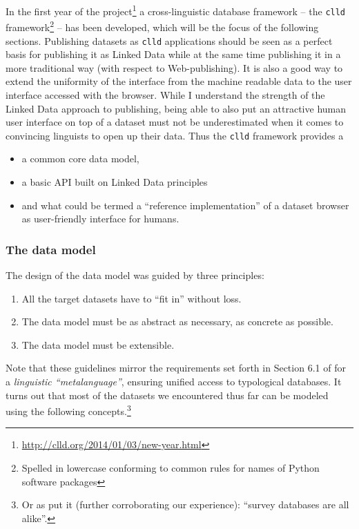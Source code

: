 \documentclass[a4paper,10pt]{article}
\begin{document}
In the first year of the project\footnote{\url{http://clld.org/2014/01/03/new-year.html}} a cross-linguistic database framework -- the \texttt{clld} framework\footnote{Spelled in lowercase conforming to common rules for names of Python software packages} -- has been
developed, which will be the focus of the following sections.
Publishing datasets as \texttt{clld} applications should be seen as a perfect basis for publishing it as Linked Data while at the same time publishing it in a more traditional way (with respect to Web-publishing). It is also a good way to extend the uniformity of the interface from the machine readable data to the user interface accessed with the browser.
While I understand the strength of the Linked Data approach to publishing, being able to also put an attractive human user interface on top of a dataset must not be underestimated when it comes to convincing linguists to open up their data.
Thus the \texttt{clld} framework provides a
\begin{itemize}
\item a common core data model,
\item a basic API built on Linked Data principles
\item and what could be termed a ``reference implementation'' of a dataset browser as user-friendly
interface for humans.
\end{itemize}



\subsubsection{The data model}
\label{sec:datamodel}

The design of the data model was guided by three principles:
\begin{enumerate}
\item All the target datasets have to ``fit in'' without loss.
\item The data model must be as abstract as necessary, as concrete as possible.
\item The data model must be extensible.
\end{enumerate}

Note that these guidelines mirror the requirements set forth in Section 6.1 of  for a \emph{linguistic ``metalanguage''}, ensuring unified access to typological databases.
It turns out that most of the datasets we encountered thus far can be modeled using the following concepts.\footnote{Or as  put it (further corroborating our experience): ``survey databases are all alike''.}
\end{document}
